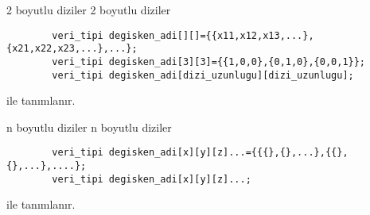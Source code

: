 \begin{frame}[fragile]{2 boyutlu diziler}
    2 boyutlu diziler
    \begin{lstlisting}
        veri_tipi degisken_adi[][]={{x11,x12,x13,...},{x21,x22,x23,...},...};
        veri_tipi degisken_adi[3][3]={{1,0,0},{0,1,0},{0,0,1}};
        veri_tipi degisken_adi[dizi_uzunlugu][dizi_uzunlugu];
    \end{lstlisting}
    ile tanımlanır.
\end{frame}
\begin{frame}[fragile]{n boyutlu diziler}
    n boyutlu diziler
    \begin{lstlisting}
        veri_tipi degisken_adi[x][y][z]...={{{},{},...},{{},{},...},....};
        veri_tipi degisken_adi[x][y][z]...;
    \end{lstlisting}
    ile tanımlanır.
\end{frame}

